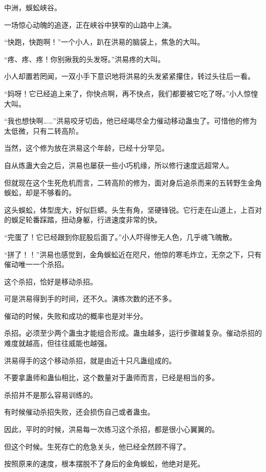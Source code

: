 
\begin{this_body}

中洲，蜈蚣峡谷。

一场惊心动魄的追逐，正在峡谷中狭窄的山路中上演。

“快跑，快跑啊！”一个小人，趴在洪易的脑袋上，焦急的大叫。

“疼、疼、疼！你别揪我的头发呀。”洪易疼的大叫。

小人却置若罔闻，一双小手下意识地将洪易的头发紧紧攥住，转过头往后一看。

“妈呀！它已经追上来了，你快点啊，再不快点，我们都要被它吃了呀。”小人惊惶大叫。

“我也想快啊……”洪易咬牙切齿，他已经竭尽全力催动移动蛊虫了。可惜他的修为太低微，只有二转高阶。

当然，这个修为放在洪易这个年龄，已经十分罕见。

自从炼蛊大会之后，洪易也屡获一些小巧机缘，所以修行速度远超常人。

但就现在这个生死危机而言，二转高阶的修为，面对身后追杀而来的五转野生金角蜈蚣，却是不够看的。

这头蜈蚣，体型庞大，好似巨蟒。头生有角，坚硬锋锐。它行走在山道上，上百对的蜈足轮番踩踏，扭动身躯，行进速度非常的快。

“完蛋了！它已经跟到你屁股后面了。”小人吓得惨无人色，几乎魂飞魄散。

“拼了！！”洪易也感觉到，金角蜈蚣近在咫尺，他惊的寒毛炸立，无奈之下，只有催动唯一一个杀招。

这个杀招，恰好是移动杀招。

可是洪易得到手的时间，还不久。演练次数的还不多。

催动的时候，失败和成功的概率也是对半分。

杀招。必须至少两个蛊虫才能组合形成。蛊虫越多，运行步骤越复杂。催动杀招的难度就越高，但往往威能也越强。

洪易得手的这个移动杀招，就是由近十只凡蛊组成的。

不要拿蛊师和蛊仙相比，这个数量对于蛊师而言，已经是相当的多。

杀招并不是那么容易训练的。

有时候催动杀招失败，还会损伤自己或者蛊虫。

因此，平时的时候，洪易每一次练习这个杀招，都是很小心翼翼的。

但这个时候。生死存亡的危急关头，他已经全然顾不得了。

按照原来的速度，根本摆脱不了身后的金角蜈蚣，他绝对是死。


\end{this_body}
